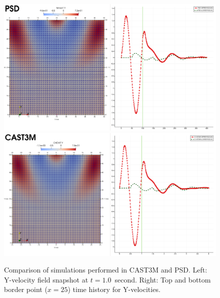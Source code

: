 \begin{figure}
	\centering
	\includegraphics[width=.8\textwidth]{./Images/PSD-t1}\\\vspace{1cm}
	\includegraphics[width=.8\textwidth]{./Images/CAST3M-t1}
	\caption{Comparison of simulations performed  in CAST3M and PSD. Left: Y-velocity field snapshot at $t=1.0$~second. Right: Top and bottom border point ($x=25$) time history for Y-velocities.   }\label{fig:CastemPSD1}
\end{figure}


